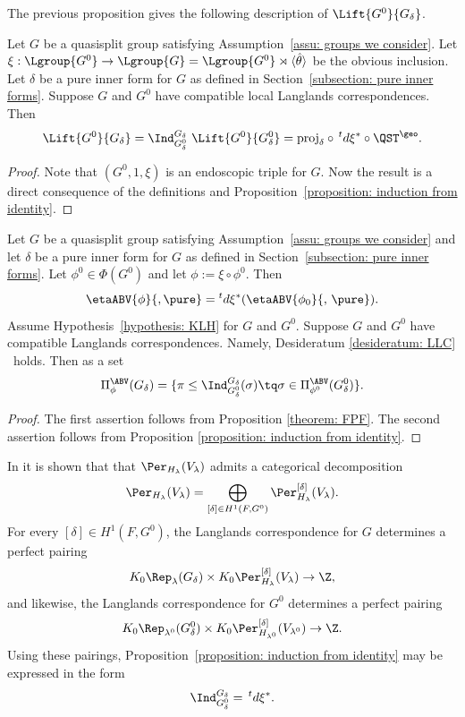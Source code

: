 \documentclass[11pt,letterpaper]{amsart}
\numberwithin{equation}{section}
\begin{document}
The previous proposition gives the following description of $\Lift{G^0}{G_\delta}$.

\begin{corollary}\label{corollary: induction from identity}
Let $G$ be a quasisplit group satisfying Assumption~\ref{assu: groups we consider}.
Let $\xi : \Lgroup{G^0} \to \Lgroup{G} = \Lgroup{G^0} \rtimes {\langle{\hat\theta}\rangle}$ be the obvious inclusion.
Let $\delta$ be a pure inner form for $G$ as defined in Section~\ref{subsection: pure inner forms}.
Suppose $G$ and $G^0$ have compatible local Langlands correspondences.
Then
\[
\Lift{G^0}{G_\delta}
    =
\Ind_{G_\delta^0}^{G_\delta} \ \Lift{G^0}{G^0_\delta}
    =
\mathrm{proj}_{\delta} \circ    \,^td\xi^* \circ \QST^{\geo}.
 \]
\end{corollary}

\begin{proof}
Note that $(G^0,1,\xi)$ is an endoscopic triple for $G$.
    Now the result is a direct consequence of the definitions and Proposition~\ref{proposition: induction from identity}.
\end{proof}


\begin{theorem}\label{theorem: tranfer from the identity}
Let $G$ be a quasisplit group satisfying Assumption~\ref{assu: groups we consider} and let $\delta$ be a pure inner form for $G$ as defined in Section~\ref{subsection: pure inner forms}. Let $\phi^0 \in \Phi(G^0)$ and let $\phi:= \xi \circ \phi^0$.
Then
\[
    \etaABV{\phi}{,\pure} = {}^t d \xi^{\ast}  (\etaABV{\phi_0}{,\,\pure}).
\]
Assume Hypothesis~\ref{hypothesis: KLH} for $G$ and $G^0$.
    Suppose $G$ and $G^0$ have compatible Langlands  correspondences. Namely, Desideratum \ref{desideratum: LLC} \RES\ holds. 
    Then as a set
\[
    \Pi^\ABV_{\phi}(G_\delta) = 
    \{ \pi\leq \Ind_{G_\delta^0}^{G_\delta} (\sigma) \tq \sigma\in \Pi^\ABV_{\phi^0}(G_\delta^0) \} .
\]
\end{theorem}

\begin{proof}
The first assertion follows from Proposition \ref{theorem: FPF}. The second assertion follows from Proposition \ref{proposition: induction from identity}.
\end{proof}


\begin{remark}
In \cite{CS2} it is shown that that $\Per_{H_\lambda}(V_\lambda)$ admits a categorical decomposition
\[
\Per_{H_\lambda}(V_\lambda)
=
\mathop{\bigoplus}\limits_{[\delta]\in H^1(F,G^0)}\Per^{[\delta]}_{H_\lambda}(V_\lambda).
\]
For every $[\delta]\in H^1(F,G^0)$, the Langlands correspondence for $G$ determines a perfect pairing
\[
K_0 \Rep_{\lambda}(G_\delta) \times K_0 \Per^{[\delta]}_{H_\lambda}(V_{\lambda}) \to \Z,
\]
and likewise, the Langlands correspondence for $G^0$ determines a perfect pairing
\[
K_0 \Rep_{\lambda^0}(G^0_\delta) \times K_0 \Per^{[\delta]}_{H_{\lambda^0}}(V_{\lambda^0}) \to \Z.
\]
Using these pairings, Proposition~\ref{proposition: induction from identity} may be expressed in the form
    \[
    \Ind_{G_\delta^0}^{G_\delta}
    =
     \,^td\xi^* .
    \]
\end{remark}
\end{document}
